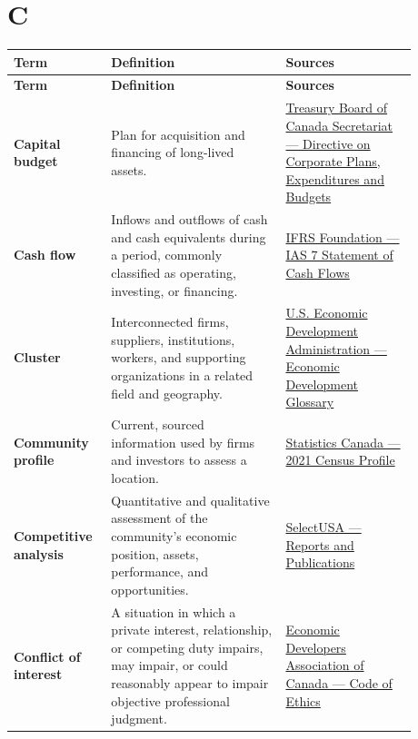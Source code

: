 \documentclass[11pt,letterpaper,oneside,openany]{book}
\begin{document}
\section[C]{C}
\begin{center}
\small
\setlength{\LTpre}{0.4em}
\setlength{\LTpost}{0.8em}
\begin{longtable}{>{\RaggedRight\arraybackslash}p{0.180\linewidth}>{\RaggedRight\arraybackslash}p{0.400\linewidth}>{\RaggedRight\arraybackslash}p{0.300\linewidth}}
\rowcolor{DeepNavy}
\color{white}\bfseries Term & \color{white}\bfseries Definition & \color{white}\bfseries Sources \\
\endfirsthead
\rowcolor{DeepNavy}
\color{white}\bfseries Term & \color{white}\bfseries Definition & \color{white}\bfseries Sources \\
\endhead
\textbf{Capital budget} & Plan for acquisition and financing of long-lived assets. & \href{https://www.tbs-sct.canada.ca/pol/doc-eng.aspx?id=32574}{Treasury Board of Canada Secretariat --- Directive on Corporate Plans, Expenditures and Budgets} \\
\textbf{Cash flow} & Inflows and outflows of cash and cash equivalents during a period, commonly classified as operating, investing, or financing. & \href{https://www.ifrs.org/issued-standards/list-of-standards/ias-7-statement-of-cash-flows.html/}{IFRS Foundation --- IAS 7 Statement of Cash Flows} \\
\textbf{Cluster} & Interconnected firms, suppliers, institutions, workers, and supporting organizations in a related field and geography. & \href{https://www.eda.gov/about/economic-development-glossary}{U.S. Economic Development Administration --- Economic Development Glossary} \\
\textbf{Community profile} & Current, sourced information used by firms and investors to assess a location. & \href{https://www12.statcan.gc.ca/census-recensement/2021/dp-pd/prof/index.cfm?Lang=E}{Statistics Canada --- 2021 Census Profile} \\
\textbf{Competitive analysis} & Quantitative and qualitative assessment of the community's economic position, assets, performance, and opportunities. & \href{https://www.trade.gov/selectusa-reports-and-publications}{SelectUSA --- Reports and Publications} \\
\textbf{Conflict of interest} & A situation in which a private interest, relationship, or competing duty impairs, may impair, or could reasonably appear to impair objective professional judgment. & \href{https://edac.ca/about/code-of-ethics/}{Economic Developers Association of Canada --- Code of Ethics} \\

\end{longtable}
\end{center}
\end{document}
